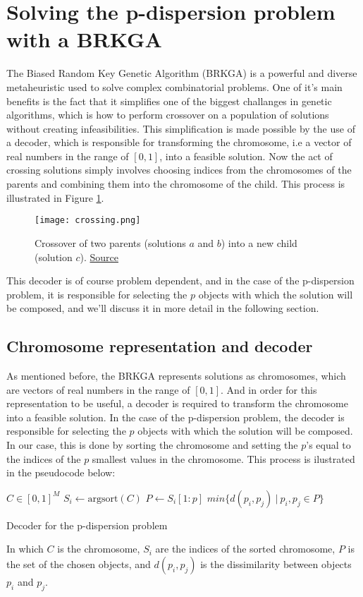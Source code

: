 \documentclass[preprint,12pt]{elsarticle}
\begin{document}
\section{Solving the p-dispersion problem with a BRKGA}
\label{sec:brkga}
The Biased Random Key Genetic Algorithm (BRKGA) is a powerful and diverse metaheuristic used to solve complex combinatorial problems. One of it's main benefits is the fact that it simplifies one of the biggest challanges in genetic algorithms, which is how to perform crossover on a population of solutions without creating infeasibilities.
This simplification is made possible by the use of a decoder, which is responsible for transforming the chromosome, i.e a vector of real numbers in the range of $[0,1]$, into a feasible solution. Now the act of crossing solutions simply involves choosing indices from the chromosomes of the parents and combining them into the chromosome of the child. This process is illustrated in Figure \ref{fig:crossing}.
\begin{figure}[!ht]
    \centering
    \texttt{[image: crossing.png]}
    \caption{Crossover of two parents (solutions $a$ and $b$) into a new child (solution $c$). \href{https://mauricio.resende.info/talks/2012-09-CLAIO2012-brkga-tutorial-both-days.pdf}{Source}}
    \label{fig:crossing}
\end{figure}
This decoder is of course problem dependent, and in the case of the p-dispersion problem, it is responsible for selecting the $p$ objects with which the solution will be composed, and we'll discuss it in more detail in the following section.
\subsection{Chromosome representation and decoder}
As mentioned before, the BRKGA represents solutions as chromosomes, which are vectors of real numbers in the range of $[0,1]$. And in order for this representation to be useful, a decoder is required to transform the chromosome into a feasible solution. In the case of the p-dispersion problem, the decoder is responsible for selecting the $p$ objects with which the solution will be composed.
In our case, this is done by sorting the chromosome and setting the $p$'s equal to the indices of the $p$ smallest values in the chromosome.
This process is ilustrated in the pseudocode below:
\begin{algorithm}[H]
    \label{alg:decoder}
    \begin{algorithmic}[1]
        \Require $C \in [0, 1]^M$
        \State $S_i \leftarrow \text{argsort}(C)$
        \State $P \leftarrow S_i[1:p]$
        \State \Return $min \{ d(p_i, p_j) \ | \ p_i, p_j \in P \}$
    \end{algorithmic}
    \caption{Decoder for the p-dispersion problem}
\end{algorithm}
In which $C$ is the chromosome, $S_i$ are the indices of the sorted chromosome, $P$ is the set of the chosen objects, and $d(p_i, p_j)$ is the dissimilarity between objects $p_i$ and $p_j$.
\end{document}
